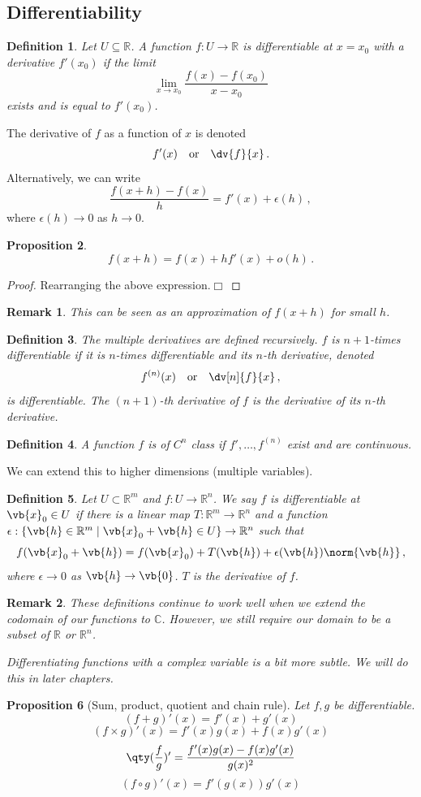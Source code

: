\documentclass{article}
\theoremstyle{plain}\theoremheaderfont{\normalfont\itshape}\theorembodyfont{\rmfamily}\theoremseparator{.}\newtheorem*{rem}{Remark}\newtheorem*{ex}{Example}\newtheorem*{proof}{Proof}\newtheorem*{altp}{Alternative proof}
\theoremstyle{plain}\theoremheaderfont{\normalfont\bfseries}\theorembodyfont{\rmfamily}\theoremseparator{.}\newtheorem{thm}{Theorem}[section]\newtheorem{lem}[thm]{Lemma}\newtheorem{prop}[thm]{Proposition}\newtheorem*{cor}{Corollary}\newtheorem{defn}[thm]{Definition}\newtheorem{clm}[thm]{Claim}\newtheorem{clminproof}{Claim}
\theoremstyle{break}\theoremheaderfont{\normalfont\itshape}\theorembodyfont{\rmfamily}\theoremseparator{.\medskip}\newtheorem*{proofskip}{Proof}\newtheorem*{exs}{Examples}\newtheorem*{rems}{Remarks}
\theoremstyle{break}\theoremheaderfont{\normalfont\bfseries}\theorembodyfont{\rmfamily}\theoremseparator{.\medskip}\newtheorem{lemskip}[thm]{Lemma}\newtheorem{defnskip}[thm]{Definition}\newtheorem{propskip}[thm]{Proposition}\newtheorem{thmskip}[thm]{Theorem}
\numberwithin{equation}{section}
\newcommand{\qed}{\hfill\ensuremath{\Box}}
\begin{document}
	\subsection{Differentiability}
	\begin{defn}
		Let \(U\subseteq\mathbb{R}\). A function \(f:U\to\mathbb{R}\) is \textit{differentiable} at \(x=x_0\) with a \textit{derivative} \(f'(x_0)\) if the limit
		\[\lim_{x\to x_0}\frac{f(x)-f(x_0)}{x-x_0}\]
		exists and is equal to \(f'(x_0)\).
	\end{defn}
	The derivative of \(f\) as a function of \(x\) is denoted
		\[f'(x)\quad\text{or}\quad\dv{f}{x}\,.\]
	Alternatively, we can write
	\[\frac{f(x+h)-f(x)}{h}=f'(x)+\epsilon(h)\,,\]
	where \(\epsilon(h)\to 0\) as \(h\to 0\).
	\begin{prop}
		\[f(x+h)=f(x)+hf'(x)+o(h)\,.\]
	\end{prop}
	\begin{proof}
		Rearranging the above expression.\qed
	\end{proof}
	\begin{rem}
		This can be seen as an approximation of \(f(x+h)\) for small \(h\).
	\end{rem}
	\begin{defn}
		The \textit{multiple derivatives} are defined recursively. \(f\) is \(n+1\)-times differentiable if it is \(n\)-times differentiable and its \(n\)-th derivative, denoted
		\[f^{(n)}(x)\quad\text{or}\quad\dv[n]{f}{x}\,,\]
		is differentiable. The \((n+1)\)-th derivative of \(f\) is the derivative of its \(n\)-th derivative.
	\end{defn}
	\begin{defn}
		A function \(f\) is of \(C^n\) class if \(f',\dots,f^{(n)}\) exist and are continuous. 
	\end{defn}

	We can extend this to higher dimensions (multiple variables).

	\begin{defn}
		Let \(U\subset\mathbb{R}^m\) and \(f:U\to\mathbb{R}^n\). We say \(f\) is \textit{differentiable} at \(\vb{x}_0\in U\) if there is a linear map \(T:\mathbb{R}^m\to\mathbb{R}^n\) and a function \(\epsilon:\{\vb{h}\in\mathbb{R}^m\mid \vb{x}_0+\vb{h}\in U\}\to\mathbb{R}^n\) such that
		\[f(\vb{x}_0+\vb{h})=f(\vb{x}_0)+T(\vb{h})+\epsilon(\vb{h})\norm{\vb{h}}\,,\]
		where \(\epsilon\to 0\) as \(\vb{h}\to\vb{0}\). \(T\) is the derivative of \(f\).
	\end{defn}
	\begin{rem}
		These definitions continue to work well when we extend the codomain of our functions to \(\mathbb{C}\). However, we still require our domain to be a subset of \(\mathbb{R}\) or \(\mathbb{R}^n\).

		Differentiating functions with a complex variable is a bit more subtle. We will do this in later chapters.
	\end{rem}
	\begin{prop}[Sum, product, quotient and chain rule]
		Let \(f,g\) be differentiable.
		\[(f+g)'(x)=f'(x)+g'(x)\]
		\[(f\times g)'(x)=f'(x)g(x)+f(x)g'(x)\]
		\[\qty(\frac{f}{g})'=\frac{f'(x)g(x)-f(x)g'(x)}{g(x)^2}\]
		\[(f\circ g)'(x)=f'(g(x))g'(x)\]	
	\end{prop}
\end{document}
